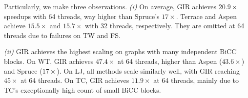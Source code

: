 
Particularly, we make three observations.
\textit{(i)} On average, GIR achieves $20.9\times$ speedups with 64 threads, way higher than Spruce's $17\times$.
Terrace and Aspen achieve $15.5\times$ and $15.7\times$ with 32 threads, respectively. They are omitted at 64 threads due to failures on TW and FS.




\textit{(ii)} GIR achieves the highest scaling on graphs with many independent BiCC blocks.
On WT, GIR achieves $47.4\times$ at 64 threads, higher than Aspen ($43.6\times$) and Spruce ($17\times$).
On LJ, all methods scale similarly well, with GIR reaching $45\times$ at 64 threads.
On TC, GIR achieves $11.9\times$ at 64 threads, mainly due to TC's exceptionally high count of small BiCC blocks.


